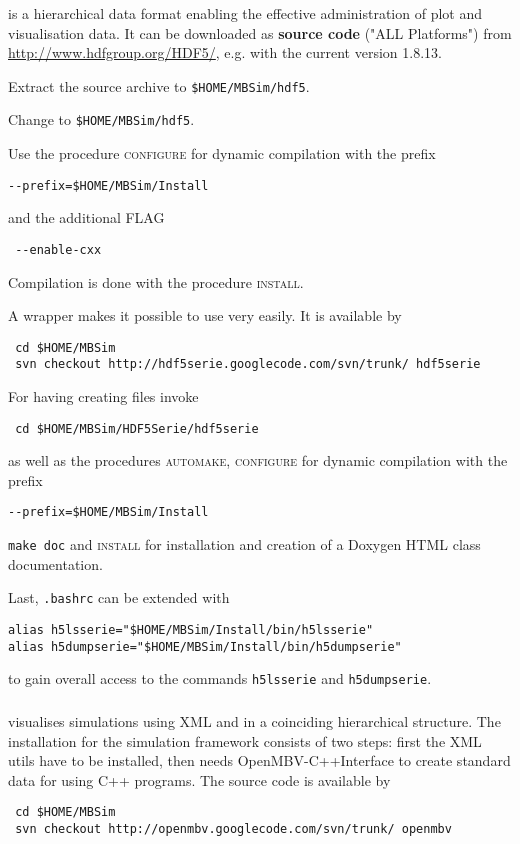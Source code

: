 \subsubsection{\HDF}
\HDF{} is a hierarchical data format enabling the effective administration of plot and visualisation data. It can be downloaded as \textbf{source code} ("ALL Platforms") 
from \url{http://www.hdfgroup.org/HDF5/}, e.g. with the current version 1.8.13.\par
Extract the source archive to \texttt{\$HOME/MBSim/hdf5}.\par
Change to \texttt{\$HOME/MBSim/hdf5}.\par
Use the procedure \textsc{configure} for dynamic compilation with the prefix
\begin{verbatim}
--prefix=$HOME/MBSim/Install
\end{verbatim}
and the additional FLAG
\begin{verbatim}
 --enable-cxx
\end{verbatim}
Compilation is done with the procedure \textsc{install}.\par
A \HDF{} wrapper makes it possible to use \HDF{} very easily. It is available by
\begin{verbatim}
 cd $HOME/MBSim
 svn checkout http://hdf5serie.googlecode.com/svn/trunk/ hdf5serie
\end{verbatim}
For having \MBSim{} creating \HDF{} files invoke
\begin{verbatim}
 cd $HOME/MBSim/HDF5Serie/hdf5serie
\end{verbatim}
as well as the procedures \textsc{automake, configure} for dynamic compilation with the prefix
\begin{verbatim}
--prefix=$HOME/MBSim/Install
\end{verbatim}
\texttt{make doc} and \textsc{install} for installation and creation of a Doxygen HTML class documentation.\par
Last, \texttt{.bashrc} can be extended with
\begin{verbatim}
alias h5lsserie="$HOME/MBSim/Install/bin/h5lsserie"
alias h5dumpserie="$HOME/MBSim/Install/bin/h5dumpserie"
\end{verbatim}
to gain overall access to the commands \texttt{h5lsserie} and \texttt{h5dumpserie}.

\subsubsection{\OpenMBV{}}
\OpenMBV{} visualises \MBSim{} simulations using XML and \HDF{} in a coinciding hierarchical structure. The installation for the simulation framework consists of two steps: first the XML utils have to be installed, then \MBSim{} needs \textsf{OpenMBV-C++Interface} to create standard data for \OpenMBV{} using C++ programs. The source code is available by
\begin{verbatim}
 cd $HOME/MBSim
 svn checkout http://openmbv.googlecode.com/svn/trunk/ openmbv
\end{verbatim}

